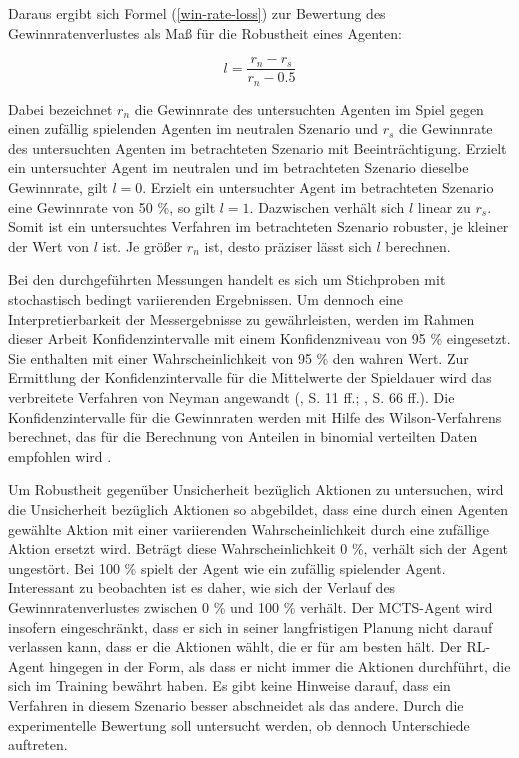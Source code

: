 Daraus ergibt sich Formel (\ref{win-rate-loss}) zur Bewertung des Gewinnratenverlustes als Maß für die Robustheit eines Agenten:

\begin{equation}\label{win-rate-loss}
	l = \frac{r_n - r_s}{r_n - 0.5}
\end{equation}

Dabei bezeichnet $r_n$ die Gewinnrate des untersuchten Agenten im Spiel gegen einen zufällig spielenden Agenten im neutralen Szenario und $r_s$ die Gewinnrate des untersuchten Agenten im betrachteten Szenario mit Beeinträchtigung. Erzielt ein untersuchter Agent im neutralen und im betrachteten Szenario dieselbe Gewinnrate, gilt $l = 0$. Erzielt ein untersuchter Agent im betrachteten Szenario eine Gewinnrate von 50 \%, so gilt $l = 1$. Dazwischen verhält sich $l$ linear zu $r_s$. Somit ist ein untersuchtes Verfahren im betrachteten Szenario robuster, je kleiner der Wert von $l$ ist. Je größer $r_n$ ist, desto präziser lässt sich $l$ berechnen.

Bei den durchgeführten Messungen handelt es sich um Stichproben mit stochastisch bedingt variierenden Ergebnissen. Um dennoch eine Interpretierbarkeit der Messergebnisse zu gewährleisten, werden im Rahmen dieser Arbeit Konfidenzintervalle mit einem Konfidenzniveau von 95 \% eingesetzt. Sie enthalten mit einer Wahrscheinlichkeit von 95 \% den wahren Wert. Zur Ermittlung der Konfidenzintervalle für die Mittelwerte der Spieldauer wird das verbreitete Verfahren von Neyman angewandt (\cite{Frost.2023}, S. 11 ff.; \cite{Janzyk.2020}, S. 66 ff.). Die Konfidenzintervalle für die Gewinnraten werden mit Hilfe des Wilson-Verfahrens berechnet, das für die Berechnung von Anteilen in binomial verteilten Daten empfohlen wird \cite{Wallis.2013} \cite{Lawrence.2001}.

Um Robustheit gegenüber Unsicherheit bezüglich Aktionen zu untersuchen, wird die Unsicherheit bezüglich Aktionen so abgebildet, dass eine durch einen Agenten gewählte Aktion mit einer variierenden Wahrscheinlichkeit durch eine zufällige Aktion ersetzt wird. Beträgt diese Wahrscheinlichkeit 0 \%, verhält sich der Agent ungestört. Bei 100 \% spielt der Agent wie ein zufällig spielender Agent. Interessant zu beobachten ist es daher, wie sich der Verlauf des Gewinnratenverlustes zwischen 0 \% und 100 \% verhält. Der MCTS-Agent wird insofern eingeschränkt, dass er sich in seiner langfristigen Planung nicht darauf verlassen kann, dass er die Aktionen wählt, die er für am besten hält. Der RL-Agent hingegen in der Form, als dass er nicht immer die Aktionen durchführt, die sich im Training bewährt haben. Es gibt keine Hinweise darauf, dass ein Verfahren in diesem Szenario besser abschneidet als das andere. Durch die experimentelle Bewertung soll untersucht werden, ob dennoch Unterschiede auftreten.

